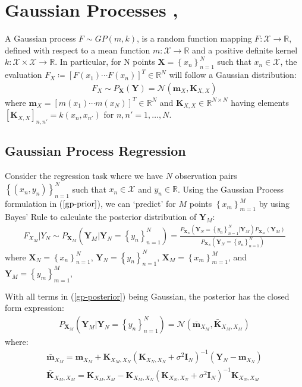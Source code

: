 \documentclass[twoside,11pt]{article}
\begin{document}
\section{Gaussian Processes \cite{wild2022generalized}, \cite{wild2023connections}}
A Gaussian process $F \sim GP(m, k)$, is a random function mapping $F: \mathcal{X} \rightarrow \mathbb{R}$, defined with respect to a mean function $m: \mathcal{X} \rightarrow \mathbb{R}$ and a positive definite kernel $k: \mathcal{X} \times \mathcal{X} \rightarrow \mathbb{R}$. In particular, for N points $\mathbf{X} = \left\{ x_n\right\}_{n=1}^N$ such that $x_n \in \mathcal{X}$, the evaluation $F_X \coloneqq \left[F(x_1) \cdots F(x_n)\right]^T \in \mathbb{R}^N$ will follow a Gaussian distribution:
\begin{align}
    F_X \sim P_{\mathbf{X}}(\mathbf{Y}) = \mathcal{N}(\mathbf{m}_X, \mathbf{K}_{X, X})
    \label{gp-prior}
\end{align}
where $\mathbf{m}_X = \left[ m(x_1) \cdots m(x_N)\right]^T \in \mathbb{R}^N$ and $\mathbf{K}_{X, X} \in \mathbb{R}^{N \times N}$ having elements $\left[\mathbf{K}_{X, X}\right]_{n, n'} = k(x_n, x_{n'})$ for $n, n'=1,\dots, N$. 
\subsection{Gaussian Process Regression \cite{wild2023connections}}
Consider the regression task where we have $N$ observation pairs $\left\{(x_n, y_n)\right\}_{n=1}^N$ such that $x_n \in \mathcal{X}$ and $y_n \in \mathbb{R}$. Using the Gaussian Process formulation in ($\ref{gp-prior}$), we can `predict' for $M$ points $\left\{ x_m\right\}_{m=1}^M$ by using Bayes' Rule to calculate the posterior distribution of $\mathbf{Y}_M$:
\begin{align}
    F_{X_M} \vert Y_N \sim P_{\mathbf{X}_M}(\mathbf{Y}_M | \mathbf{Y}_N= \left\{ y_n\right\}_{n=1}^N) = \frac{ P_{\mathbf{X}_N}(\mathbf{Y}_N=\left\{ y_n\right\}_{n=1}^N \vert \mathbf{Y}_M)  P_{\mathbf{X}_M}(\mathbf{Y}_M)}{ P_{\mathbf{X}_N}(\mathbf{Y}_N= \left\{ y_n\right\}_{n=1}^N)}
    \label{gp-posterior}
\end{align}
where $\mathbf{X}_N = \left\{ x_n\right\}_{n=1}^N$, $\mathbf{Y}_N = \left\{ y_n\right\}_{n=1}^N$, $\mathbf{X}_M = \left\{ x_m\right\}_{m=1}^M$, and $\mathbf{Y}_M = \left\{ y_m\right\}_{m=1}^M$,

With all terms in (\ref{gp-posterior}) being Gaussian, the posterior has the closed form expression:
\begin{align}
    P_{\mathbf{X}_M}\left(\mathbf{Y}_M \vert  \mathbf{Y}_N =  \left\{ y_n\right\}_{n=1}^N\right) =  \mathcal{N}(\bar{\mathbf{m}}_{X_M}, \bar{\mathbf{K}}_{X_M, X_M})
\end{align}
where:
\begin{align}
    \label{gp-posterior-mean}
    \bar{\mathbf{m}}_{X_M} = \mathbf{m}_{X_M} + \mathbf{K}_{X_M, X_N} \left( \mathbf{K}_{X_N, X_N} + \sigma^2 \mathbf{I}_N\right)^{-1} \left( \mathbf{Y}_N - \mathbf{m}_{X_N}\right)\\
    \label{gp-posterior-covariance}
    \bar{\mathbf{K}}_{X_M, X_M} = \mathbf{K}_{X_M, X_M} - \mathbf{K}_{X_M, X_N}\left( \mathbf{K}_{X_N, X_N} + \sigma^2 \mathbf{I}_N\right)^{-1}\mathbf{K}_{X_N, X_M}
\end{align}
\end{document}
